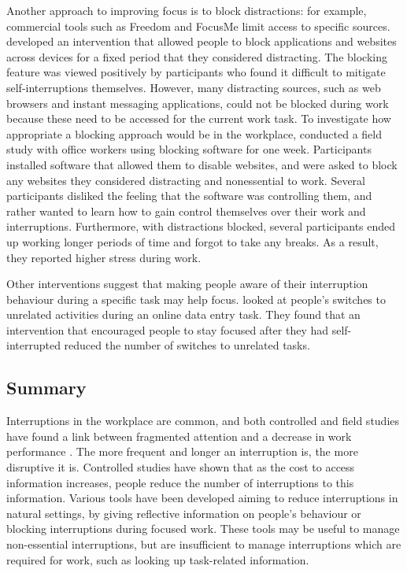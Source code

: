 Another approach to improving focus is to block distractions: for example, commercial tools such as Freedom \citep{Freedom} and FocusMe \citep{FocusMe} limit access to specific sources. \citet{Kim2017} developed an intervention that allowed people to block applications and websites across devices for a fixed period that they considered distracting. The blocking feature was viewed positively by participants who found it difficult to mitigate self-interruptions themselves. However, many distracting sources, such as web browsers and instant messaging applications, could not be blocked during work because these need to be accessed for the current work task. To investigate how appropriate a blocking approach would be in the workplace, \citet{Mark2018} conducted a field study with office workers using blocking software for one week. Participants installed software that allowed them to disable websites, and were asked to block any websites they considered distracting and nonessential to work. Several participants disliked the feeling that the software was controlling them, and rather wanted to learn how to gain control themselves over their work and interruptions. Furthermore, with distractions blocked, several participants ended up working longer periods of time and forgot to take any breaks. As a result, they reported higher stress during work.

Other interventions suggest that making people aware of their interruption behaviour during a specific task may help focus. \citet{Gould2016a} looked at people's switches to unrelated activities during an online data entry task. They found that an intervention that encouraged people to stay focused after they had self-interrupted reduced the number of switches to unrelated tasks. 

\subsection{Summary}
Interruptions in the workplace are common, and both controlled and field studies have found a link between fragmented attention and a decrease in work performance \citep{Bailey2001, Carrier2015}. The more frequent and longer an interruption is, the more disruptive it is. Controlled studies have shown that as the cost to access information increases, people reduce the number of interruptions to this information. Various tools have been developed aiming to reduce interruptions in natural settings, by giving reflective information on people's behaviour or blocking interruptions during focused work. These tools may be useful to manage non-essential interruptions, but are insufficient to manage interruptions which are required for work, such as looking up task-related information. 

